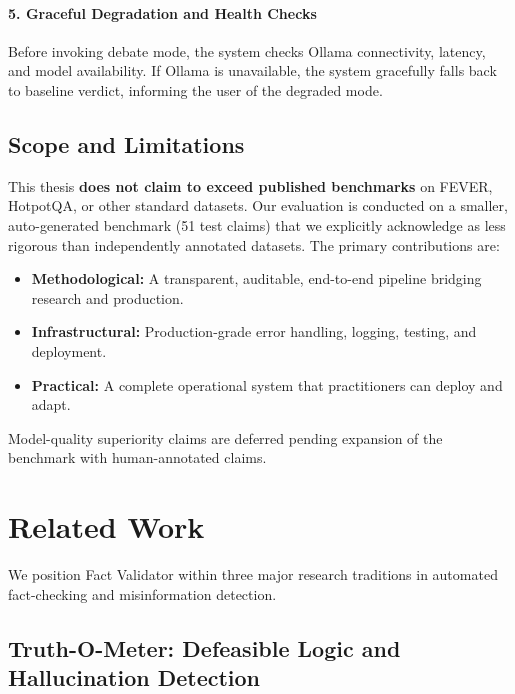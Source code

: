 \documentclass[12pt,a4paper,twoside]{article}
\begin{document}
\paragraph{5. Graceful Degradation and Health Checks}
Before invoking debate mode, the system checks Ollama connectivity, latency, and model availability. If Ollama is unavailable, the system gracefully falls back to baseline verdict, informing the user of the degraded mode.

\subsection{Scope and Limitations}

This thesis \textbf{does not claim to exceed published benchmarks} on FEVER, HotpotQA, or other standard datasets. Our evaluation is conducted on a smaller, auto-generated benchmark (51 test claims) that we explicitly acknowledge as less rigorous than independently annotated datasets. The primary contributions are:

\begin{itemize}
    \item \textbf{Methodological:} A transparent, auditable, end-to-end pipeline bridging research and production.
    \item \textbf{Infrastructural:} Production-grade error handling, logging, testing, and deployment.
    \item \textbf{Practical:} A complete operational system that practitioners can deploy and adapt.
\end{itemize}

Model-quality superiority claims are deferred pending expansion of the benchmark with human-annotated claims.

\section{Related Work}

We position Fact Validator within three major research traditions in automated fact-checking and misinformation detection.

\subsection{Truth-O-Meter: Defeasible Logic and Hallucination Detection}
\end{document}
